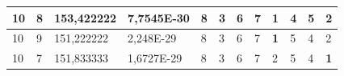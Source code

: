 \documentclass[conference]{IEEEtran}
\begin{document}
\begin{table}[]
\begin{tabular}{|llll|llllllll|}
\multicolumn{1}{|l|}{10}                                                    & \multicolumn{1}{l|}{8}                                                        & \multicolumn{1}{l|}{153,422222}                                                   & 7,7545E-30                     & \multicolumn{1}{l|}{8}                                                  & \multicolumn{1}{l|}{3}                                                  & \multicolumn{1}{l|}{6}                                                  & \multicolumn{1}{l|}{7}                                                  & \multicolumn{1}{l|}{\textbf{1}}                                         & \multicolumn{1}{l|}{4}                                                  & \multicolumn{1}{l|}{5}                                                  & 2                          \\ \hline
\multicolumn{1}{|l|}{10}                                                    & \multicolumn{1}{l|}{9}                                                        & \multicolumn{1}{l|}{151,222222}                                                   & 2,248E-29                      & \multicolumn{1}{l|}{8}                                                  & \multicolumn{1}{l|}{3}                                                  & \multicolumn{1}{l|}{6}                                                  & \multicolumn{1}{l|}{7}                                                  & \multicolumn{1}{l|}{\textbf{1}}                                         & \multicolumn{1}{l|}{5}                                                  & \multicolumn{1}{l|}{4}                                                  & 2                          \\ \hline
\multicolumn{1}{|l|}{10}                                                    & \multicolumn{1}{l|}{7}                                                        & \multicolumn{1}{l|}{151,833333}                                                   & 1,6727E-29                     & \multicolumn{1}{l|}{8}                                                  & \multicolumn{1}{l|}{3}                                                  & \multicolumn{1}{l|}{6}                                                  & \multicolumn{1}{l|}{7}                                                  & \multicolumn{1}{l|}{2}                                                  & \multicolumn{1}{l|}{5}                                                  & \multicolumn{1}{l|}{4}                                                  & \textbf{1}                 \\ \hline

\end{tabular}
\end{table}
\end{document}
